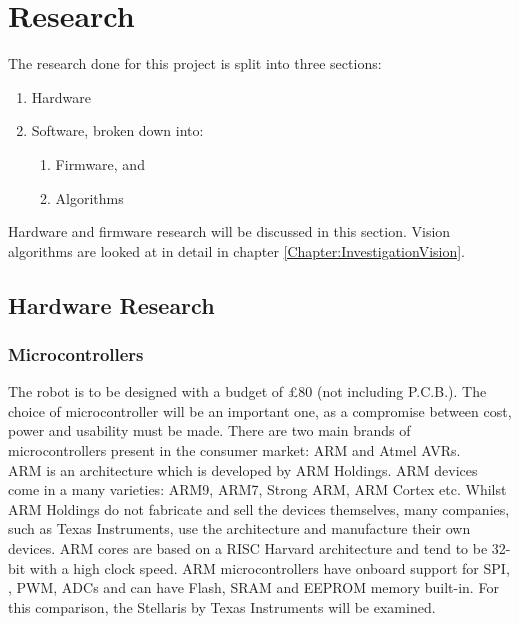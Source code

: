 \chapter{Research} \label{Chapter:Research}
The research done for this project is split into three sections:
\begin{enumerate}
\item Hardware
\item Software, broken down into:
\begin{enumerate}
\item Firmware, and
\item Algorithms
\end{enumerate}
\end{enumerate}

Hardware and firmware research will be discussed in this section. Vision algorithms are looked at in detail in chapter \ref{Chapter:InvestigationVision}.
\section{Hardware Research}
\subsection{Microcontrollers}
The robot is to be designed with a budget of \pounds 80 (not including P.C.B.). The choice of microcontroller will be an important one, as a compromise between cost, power and usability must be made. There are two main brands of microcontrollers present in the consumer market: ARM and Atmel AVRs.\\ %
ARM is an architecture which is developed by ARM Holdings. ARM devices come in a many varieties: ARM9, ARM7, Strong ARM, ARM Cortex etc. Whilst ARM Holdings do not fabricate and sell the devices themselves, many companies, such as Texas Instruments, use the architecture and manufacture their own devices. ARM cores are based on a RISC Harvard architecture and tend to be 32-bit with a high clock speed. ARM microcontrollers have onboard support for SPI, \itc, PWM, ADCs and can have Flash, SRAM and EEPROM memory built-in. For this comparison, the Stellaris by Texas Instruments will be examined. 

